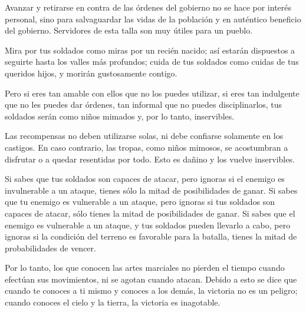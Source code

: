 Avanzar y retirarse en contra de las órdenes del gobierno no se hace por interés personal, sino para salvaguardar las vidas de la población y en auténtico beneficio del gobierno. Servidores de esta talla son muy útiles para un pueblo.

Mira por tus soldados como miras por un recién nacido; así estarán dispuestos a seguirte hasta los valles más profundos; cuida de tus soldados como cuidas de tus queridos hijos, y morirán gustosamente contigo.

Pero si eres tan amable con ellos que no los puedes utilizar, si eres tan indulgente que no les puedes dar órdenes, tan informal que no puedes disciplinarlos, tus soldados serán como niños mimados y, por lo tanto, inservibles.

Las recompensas no deben utilizarse solas, ni debe confiarse solamente en los castigos. En caso contrario, las tropas, como niños mimosos, se acostumbran a disfrutar o a quedar resentidas por todo. Esto es dañino y los vuelve inservibles.

Si sabes que tus soldados son capaces de atacar, pero ignoras si el enemigo es invulnerable a un ataque, tienes sólo la mitad de posibilidades de ganar. Si sabes que tu enemigo es vulnerable a un ataque, pero ignoras si tus soldados son capaces de atacar, sólo tienes la mitad de posibilidades de ganar. Si sabes que el enemigo es vulnerable a un ataque, y tus soldados pueden llevarlo a cabo, pero ignoras si la condición del terreno es favorable para la batalla, tienes la mitad de probabilidades de vencer.

Por lo tanto, los que conocen las artes marciales no pierden el tiempo cuando efectúan sus movimientos, ni se agotan cuando atacan. Debido a esto se dice que cuando te conoces a ti mismo y conoces a los demás, la victoria no es un peligro; cuando conoces el cielo y la tierra, la victoria es inagotable.
